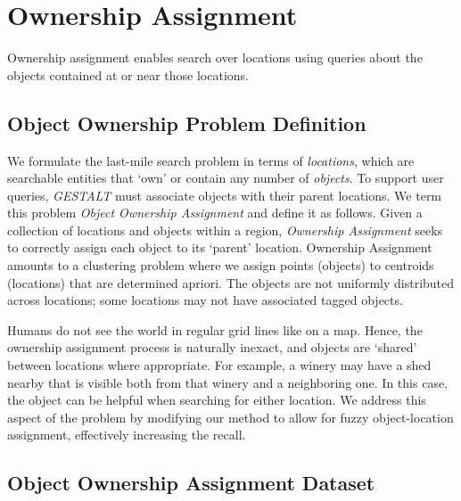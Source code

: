 \section{Ownership Assignment}
\label{section:ownership}

Ownership assignment enables search over locations using queries about the objects contained at or near those locations.

\subsection{Object Ownership Problem Definition}

We formulate the last-mile search problem in terms of \textit{locations}, which are searchable entities that `own' or contain any number of \textit{objects}. 
To support user queries, \emph{GESTALT} must associate objects with their parent locations.
We term this problem \textit{Object Ownership Assignment} and define it as follows.
Given a collection of locations and objects within a region, \emph{Ownership Assignment} seeks to correctly assign each object to its `parent' location. 
Ownership Assignment amounts to a clustering problem where we assign points (objects) to centroids (locations) that are determined apriori. 
The objects are not uniformly distributed across locations; some locations may not have associated tagged objects. 

Humans do not see the world in regular grid lines like on a map. Hence, the ownership assignment process is naturally inexact, and objects are `shared' between locations where appropriate.
For example, a winery may have a shed nearby that is visible both from that winery and a neighboring one. 
In this case, the object can be helpful when searching for either location. 
We address this aspect of the problem by modifying our method to allow for fuzzy object-location assignment, effectively increasing the recall. 

\subsection{Object Ownership Assignment Dataset}

